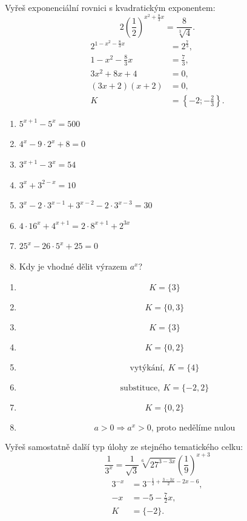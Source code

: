 \documentclass[11pt,a4paper]{article}
\begin{document}
\begin{prikladReseniBox}[title={Příklad 5}]
Vyřeš exponenciální rovnici s kvadratickým exponentem:
\[
2\left(\frac{1}{2}\right)^{x^2+\frac{8}{3} x}=\frac{8}{\sqrt[3]{4}}.
\]
\tcblower
\[
\begin{aligned}2^{1-x^2-\frac{8}{3}x}&=2^{\frac{7}{3}},\\1-x^2-\frac{8}{3}x&=\frac{7}{3},\\3x^2+8x+4&=0,\\(3x+2)(x+2)&=0,\\K&=\left\{-2;-\frac{2}{3}\right\}.\end{aligned}\]
\end{prikladReseniBox}

\begin{zadaniReseniBox}[title={Samostatná práce 1}]
\begin{enumerate}[label=\alph*)]
\item $5^{x+1}-5^x=500$
\item $4^x-9\cdot2^x+8=0$
\item $3^{x+1}-3^x=54$
\item $3^x+3^{2-x}=10$
\item $3^x-2\cdot3^{x-1}+3^{x-2}-2\cdot3^{x-3}=30$
\item $4\cdot16^x+4^{x+1}=2\cdot8^{x+1}+2^{3x}$
\item $25^x-26\cdot5^x+25=0$
\item Kdy je vhodné dělit výrazem $a^x$?
\end{enumerate}
\tcblower
\begin{enumerate}[label=\alph*)]
\item \[K=\{3\}\]
\item \[K=\{0,3\}\]
\item \[K=\{3\}\]
\item \[K=\{0,2\}\]
\item \[
\text{vytýkání},\ K=\{4\}
\]
\item \[
\text{substituce},\ K=\{-2,2\}
\]
\item \[K=\{0,2\}\]
\item \[
a>0\Rightarrow a^x>0\text{, proto nedělíme nulou}
\]
\end{enumerate}
\end{zadaniReseniBox}
\begin{zadaniReseniBox}[title={Samostatná práce 2}]
Vyřeš samostatně další typ úlohy ze stejného tematického celku:
\[
\displaystyle\frac{1}{3^x}=\frac{1}{\sqrt3}\sqrt[6]{27^{3-3x}}\left(\frac{1}{9}\right)^{x+3}
\]
\tcblower
\[\begin{aligned}3^{-x}&=3^{-\frac{1}{2}+\frac{3-3x}{2}-2x-6},\\-x&=-5-\frac{7}{2}x,\\K&=\{-2\}.\end{aligned}\]
\end{zadaniReseniBox}
\end{document}
